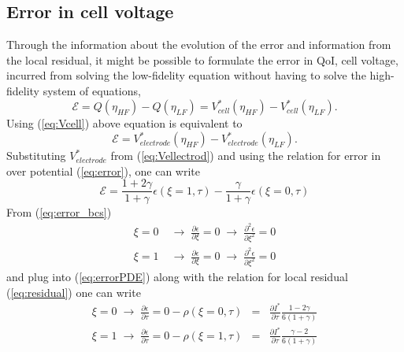\documentclass[]{article}
\begin{document}
\subsection{Error in cell voltage}
Through the information about the evolution of the error and information from the local residual, it might be possible to formulate the error in QoI, cell voltage, incurred from solving the low-fidelity equation without having to solve the high-fidelity system of equations,
%
\begin{equation}
\mathcal{E} = Q(\eta_{HF}) - Q(\eta_{LF}) = V^*_{cell}(\eta_{HF}) - V^*_{cell}(\eta_{LF}).
\end{equation}
%
Using (\ref{eq:Vcell}) above equation is equivalent to
%
\begin{equation}
\mathcal{E} =  V^*_{electrode}(\eta_{HF}) - V^*_{electrode}(\eta_{LF}).
\end{equation}
%
Substituting $V^*_{electrode}$ from (\ref{eq:Vellectrod}) and using the relation for error in over potential (\ref{eq:error}), one can write 
%
\begin{equation}\label{eq:error_V_eta}
\mathcal{E} =  \frac{1+2\gamma}{1+\gamma}\epsilon(\xi=1,\tau) - \frac{\gamma}{1+\gamma}\epsilon(\xi=0,\tau)
\end{equation}
%
From (\ref{eq:error_bcs}) 
%
\begin{eqnarray}
\xi = 0 & \;\rightarrow\; \frac{\partial\epsilon}{\partial\xi}= 0 \;\rightarrow\; \frac{\partial^2\epsilon}{\partial\xi^2}= 0  \\
\xi = 1 & \; \rightarrow\;\frac{\partial\epsilon}{\partial\xi}= 0 \;\rightarrow\; \frac{\partial^2\epsilon}{\partial\xi^2}= 0 \nonumber
\end{eqnarray}
%
and plug into (\ref{eq:errorPDE}) along with the relation for local residual (\ref{eq:residual}) one can write
%
\begin{eqnarray}
\xi = 0 \;\rightarrow\; \frac{\partial\epsilon}{\partial\tau}= 0 -\rho(\xi=0,\tau)& = &\frac{\partial I^*}{\partial\tau} \frac{1-2\gamma}{6(1+\gamma)}\\
\xi = 1 \; \rightarrow\;\frac{\partial\epsilon}{\partial\tau}= 0 -\rho(\xi=1,\tau)& = &\frac{\partial I^*}{\partial\tau} \frac{\gamma-2}{6(1+\gamma)} \nonumber
\end{eqnarray}
%
\end{document}
